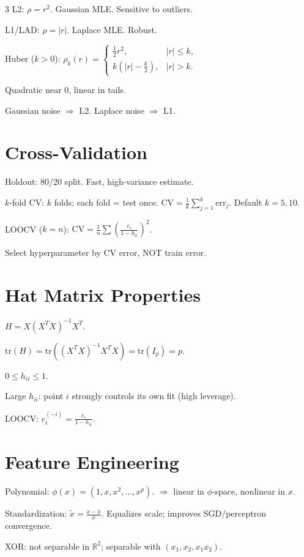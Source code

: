 \documentclass[8pt,fleqn]{extarticle}
\begin{document}
\begin{multicols}{3}
L2: $\rho=r^2$. Gaussian MLE. Sensitive to outliers.

L1/LAD: $\rho=|r|$. Laplace MLE. Robust.

Huber ($k>0$):
$\rho_k(r)=\begin{cases}\frac12r^2,&|r|\le k,\\k(|r|-\frac{k}{2}),&|r|>k.\end{cases}$

Quadratic near 0, linear in tails.

Gaussian noise $\Rightarrow$ L2. Laplace noise $\Rightarrow$ L1.


\section*{Cross-Validation}

Holdout: 80/20 split. Fast, high-variance estimate.

$k$-fold CV: $k$ folds; each fold = test once.
$\text{CV}=\frac1k\sum_{j=1}^k\text{err}_j$. Default $k=5,10$.

LOOCV ($k=n$): $\text{CV}=\frac1n\sum\!\left(\frac{e_i}{1-h_{ii}}\right)^2$.

Select hyperparameter by CV error, NOT train error.


\section*{Hat Matrix Properties}

$H=X(X^TX)^{-1}X^T$.

$\text{tr}(H)=\text{tr}((X^TX)^{-1}X^TX)=\text{tr}(I_p)=p$.

$0\le h_{ii}\le1$.

Large $h_{ii}$: point $i$ strongly controls its own fit (high leverage).

LOOCV: $e_i^{(-i)}=\frac{e_i}{1-h_{ii}}$.


\section*{Feature Engineering}

Polynomial: $\phi(x)=(1,x,x^2,\dots,x^p)$.
$\Rightarrow$ linear in $\phi$-space, nonlinear in $x$.

Standardization: $\tilde x=\frac{x-\bar x}{\sigma}$.
Equalizes scale; improves SGD/perceptron convergence.

XOR: not separable in $\mathbb R^2$; separable with $(x_1,x_2,x_1x_2)$.



\end{multicols}
\end{document}
